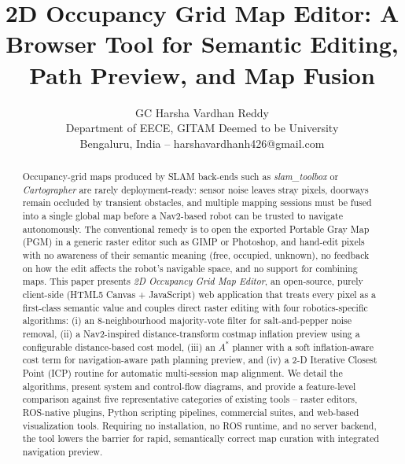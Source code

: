 \documentclass[journal]{IEEEtran}
\begin{document}
\title{\LARGE 2D Occupancy Grid Map Editor: A Browser Tool for Semantic Editing, Path Preview, and Map Fusion}

\author{GC Harsha Vardhan Reddy\\
Department of EECE, GITAM Deemed to be University\\
Bengaluru, India -- harshavardhanh426@gmail.com}

\pagestyle{empty}
\thispagestyle{empty}
\maketitle

\begin{abstract}
Occupancy-grid maps produced by SLAM back-ends such as \emph{slam\_toolbox} or \emph{Cartographer} are rarely deployment-ready: sensor noise leaves stray pixels, doorways remain occluded by transient obstacles, and multiple mapping sessions must be fused into a single global map before a Nav2-based robot can be trusted to navigate autonomously. The conventional remedy is to open the exported Portable Gray Map (PGM) in a generic raster editor such as GIMP or Photoshop, and hand-edit pixels with no awareness of their semantic meaning (free, occupied, unknown), no feedback on how the edit affects the robot's navigable space, and no support for combining maps. This paper presents \emph{2D Occupancy Grid Map Editor}, an open-source, purely client-side (HTML5 Canvas + JavaScript) web application that treats every pixel as a first-class semantic value and couples direct raster editing with four robotics-specific algorithms: (i) an 8-neighbourhood majority-vote filter for salt-and-pepper noise removal, (ii) a Nav2-inspired distance-transform costmap inflation preview using a configurable distance-based cost model, (iii) an $A^{*}$ planner with a soft inflation-aware cost term for navigation-aware path planning preview, and (iv) a 2-D Iterative Closest Point (ICP) routine for automatic multi-session map alignment. We detail the algorithms, present system and control-flow diagrams, and provide a feature-level comparison against five representative categories of existing tools -- raster editors, ROS-native plugins, Python scripting pipelines, commercial suites, and web-based visualization tools. Requiring no installation, no ROS runtime, and no server backend, the tool lowers the barrier for rapid, semantically correct map curation with integrated navigation preview.
\end{abstract}
\end{document}
